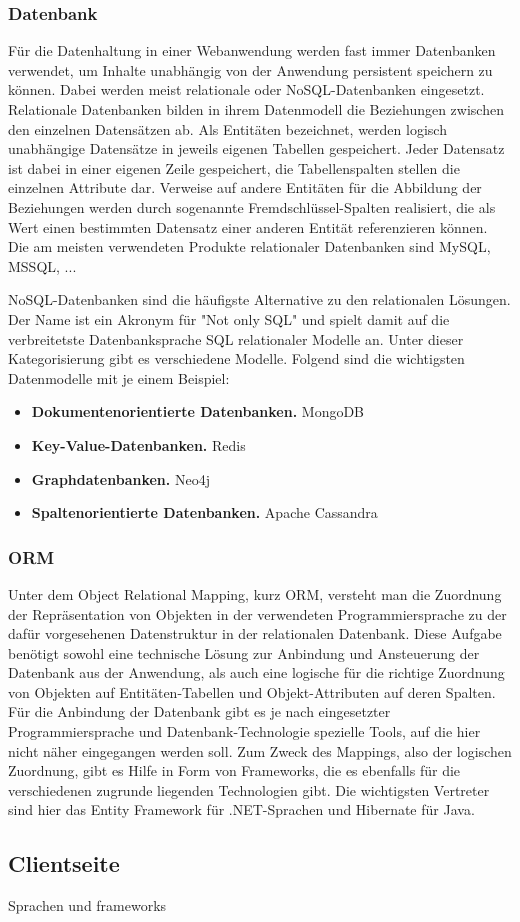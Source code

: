 
\subsubsection{Datenbank}
Für die Datenhaltung in einer Webanwendung werden fast immer Datenbanken verwendet, um Inhalte unabhängig von der Anwendung persistent speichern zu können.
Dabei werden meist relationale oder \acs{NoSQL}-Datenbanken eingesetzt. Relationale Datenbanken bilden in ihrem Datenmodell die Beziehungen zwischen den einzelnen Datensätzen ab.
Als Entitäten bezeichnet, werden logisch unabhängige Datensätze in jeweils eigenen Tabellen gespeichert. Jeder Datensatz ist dabei in einer eigenen Zeile gespeichert, die Tabellenspalten stellen die einzelnen Attribute dar.
Verweise auf andere Entitäten für die Abbildung der Beziehungen werden durch sogenannte Fremdschlüssel-Spalten realisiert, die als Wert einen bestimmten Datensatz einer anderen Entität referenzieren können.
Die am meisten verwendeten Produkte relationaler Datenbanken sind MySQL, MSSQL, ...%

\acs{NoSQL}-Datenbanken sind die häufigste Alternative zu den relationalen Lösungen. Der Name ist ein Akronym für "Not only SQL" und spielt damit auf die verbreitetste Datenbanksprache \acs{SQL} relationaler Modelle an.
Unter dieser Kategorisierung gibt es verschiedene Modelle. Folgend sind die wichtigsten Datenmodelle mit je einem Beispiel:

\begin{itemize}
\item\textbf{Dokumentenorientierte Datenbanken.} MongoDB
\item\textbf{Key-Value-Datenbanken.} Redis
\item\textbf{Graphdatenbanken.} Neo4j
\item\textbf{Spaltenorientierte Datenbanken.} Apache Cassandra
\end{itemize}

\subsubsection{ORM}
Unter dem Object Relational Mapping, kurz \acs{ORM}, versteht man die Zuordnung der Repräsentation von Objekten in der verwendeten Programmiersprache zu der dafür vorgesehenen Datenstruktur in der relationalen Datenbank.
Diese Aufgabe benötigt sowohl eine technische Lösung zur Anbindung und Ansteuerung der Datenbank aus der Anwendung, als auch eine logische für die richtige Zuordnung von Objekten auf Entitäten-Tabellen und Objekt-Attributen auf deren Spalten.
Für die Anbindung der Datenbank gibt es je nach eingesetzter Programmiersprache und Datenbank-Technologie spezielle Tools, auf die hier nicht näher eingegangen werden soll.
Zum Zweck des Mappings, also der logischen Zuordnung, gibt es Hilfe in Form von Frameworks, die es ebenfalls für die verschiedenen zugrunde liegenden Technologien gibt.
Die wichtigsten Vertreter sind hier das Entity Framework für .NET-Sprachen und Hibernate für Java.

\subsection{Clientseite}
Sprachen und frameworks

